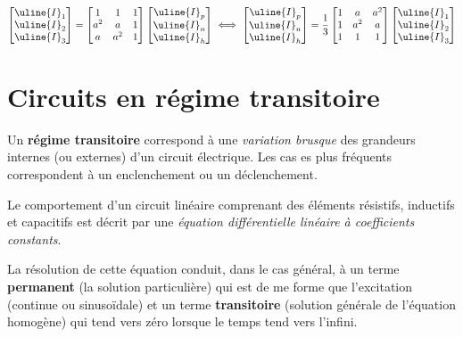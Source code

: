 \documentclass[12pt,a4paper]{article}
\newcommand{\ui}{\uline{I} }
\begin{document}
\[\begin{bmatrix}
\ui_1\\
\ui_2\\
\ui_3
\end{bmatrix} = \begin{bmatrix}
	1 & 1 & 1\\
	a^2 & a & 1\\
	a & a^2 & 1
\end{bmatrix} \begin{bmatrix}
\ui_p\\
\ui_n\\
\ui_h
\end{bmatrix} \iff \begin{bmatrix}
	\ui_p\\
	\ui_n\\
	\ui_h
\end{bmatrix} = \frac{1}{3}\begin{bmatrix}
1 & a & a^2\\
1 & a^2 & a\\
1 & 1 & 1
\end{bmatrix} \begin{bmatrix}
	\ui_1\\
	\ui_2\\
	\ui_3
\end{bmatrix}\]




\section[Régimes transitoires]{Circuits en régime transitoire}
\setcounter{equation}{0}
Un \textbf{régime transitoire} correspond à une \textit{variation brusque} des grandeurs internes (ou externes) d'un circuit électrique. Les cas es plus fréquents correspondent à un enclenchement ou un déclenchement.

Le comportement d'un circuit linéaire comprenant des éléments résistifs, inductifs et capacitifs est décrit par une \textit{équation différentielle linéaire à coefficients constants}.

La résolution de cette équation conduit, dans le cas général, à un terme \textbf{permanent} (la solution particulière) qui est de me forme que l'excitation (continue ou sinusoïdale) et un terme \textbf{transitoire} (solution générale de l'équation homogène) qui tend vers zéro lorsque le temps tend vers l'infini.
\end{document}
